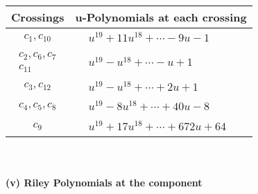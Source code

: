\documentclass[1p]{elsarticle_modified}
\theoremstyle{definition}
\begin{document}
\begin{tabular}{m{50pt}|m{274pt}}
Crossings & \hspace{64pt}u-Polynomials at each crossing \\
\hline $$\begin{aligned}c_{1},c_{10}\end{aligned}$$&$\begin{aligned}
&u^{19}+11 u^{18}+\cdots-9 u-1
\end{aligned}$\\
\hline $$\begin{aligned}c_{2},c_{6},c_{7}\\c_{11}\end{aligned}$$&$\begin{aligned}
&u^{19}- u^{18}+\cdots- u+1
\end{aligned}$\\
\hline $$\begin{aligned}c_{3},c_{12}\end{aligned}$$&$\begin{aligned}
&u^{19}- u^{18}+\cdots+2 u+1
\end{aligned}$\\
\hline $$\begin{aligned}c_{4},c_{5},c_{8}\end{aligned}$$&$\begin{aligned}
&u^{19}-8 u^{18}+\cdots+40 u-8
\end{aligned}$\\
\hline $$\begin{aligned}c_{9}\end{aligned}$$&$\begin{aligned}
&u^{19}+17 u^{18}+\cdots+672 u+64
\end{aligned}$\\
\hline
\end{tabular}\\~\\
\newpage\renewcommand{\arraystretch}{1}
\flushleft \textbf{(v) Riley Polynomials at the component}\newline \\
\end{document}
